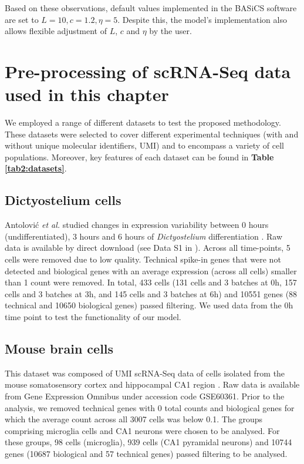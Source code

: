 Based on these observations, default values implemented in the BASiCS software are set to $L=10, c=1.2, \eta=5$. Despite this, the model's implementation also allows flexible adjustment of $L$, $c$ and $\eta$ by the user. 

\newpage

\section{Pre-processing of scRNA-Seq data used in this chapter} \label{sec2:datasets}

We employed a range of different datasets to test the proposed methodology. These datasets were selected to cover different experimental techniques (with and without unique molecular identifiers, UMI) and to encompass a variety of cell populations. Moreover, key features of each dataset can be found in \textbf{Table \ref{tab2:datasets}}. 

\subsection{Dictyostelium cells} \label{seq::data_dict}

Antolovi\'{c} \emph{et al.} studied changes in expression variability between 0 hours (undifferentiated), 3 hours and 6 hours of \emph{Dictyostelium} differentiation \cite{Antolovic2017}. Raw data is available by direct download (see Data S1 in \citep{Antolovic2017}). Across all time-points, 5 cells were removed due to low quality. Technical spike-in genes that were not detected and biological genes with an average expression (across all cells) smaller than 1 count were removed. In total, 433 cells (131 cells and 3 batches at 0h, 157 cells and 3 batches at 3h, and 145 cells and 3 batches at 6h) and 10551 genes (88 technical and 10650 biological genes) passed filtering. We used data from the 0h time point to test the functionality of our model.

\subsection{Mouse brain cells} \label{seq::data_micro}

This dataset was composed of UMI scRNA-Seq data of cells isolated from the mouse somatosensory cortex and hippocampal CA1 region \citep{Zeisel2015}. Raw data is available from Gene Expression Omnibus under accession code GSE60361. Prior to the analysis, we removed technical genes with 0 total counts and biological genes for which the average count across all 3007 cells was below 0.1. The groups comprising microglia cells and CA1 neurons were chosen to be analysed. For these groups, 98 cells (microglia), 939 cells (CA1 pyramidal neurons) and 10744 genes (10687 biological and 57 technical genes) passed filtering to be analysed.


